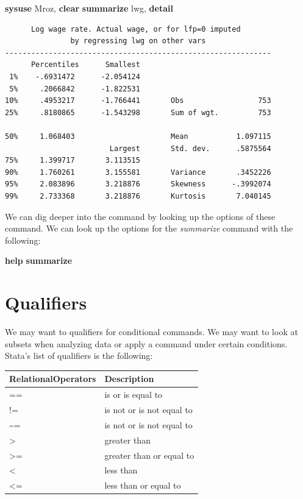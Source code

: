 \documentclass[
]{book}
\newenvironment{Shaded}{\begin{snugshade}}{\end{snugshade}}
\newcommand{\KeywordTok}[1]{\textcolor[rgb]{0.13,0.29,0.53}{\textbf{#1}}}
\newcommand{\NormalTok}[1]{#1}
\begin{document}
\begin{Shaded}
\begin{Highlighting}[]
\KeywordTok{sysuse}\NormalTok{ Mroz, }\KeywordTok{clear}
\KeywordTok{summarize}\NormalTok{ lwg, }\KeywordTok{detail} 
\end{Highlighting}
\end{Shaded}

\begin{verbatim}
      Log wage rate. Actual wage, or for lfp=0 imputed
               by regressing lwg on other vars
-------------------------------------------------------------
      Percentiles      Smallest
 1%    -.6931472      -2.054124
 5%     .2066842      -1.822531
10%     .4953217      -1.766441       Obs                 753
25%     .8180865      -1.543298       Sum of wgt.         753

50%     1.068403                      Mean           1.097115
                        Largest       Std. dev.      .5875564
75%     1.399717       3.113515
90%     1.760261       3.155581       Variance       .3452226
95%     2.083896       3.218876       Skewness      -.3992074
99%     2.733368       3.218876       Kurtosis       7.040145
\end{verbatim}

We can dig deeper into the command by looking up the options of these command. We can look up the options for the \emph{summarize} command with the following:

\begin{Shaded}
\begin{Highlighting}[]
\KeywordTok{help} \KeywordTok{summarize}
\end{Highlighting}
\end{Shaded}

\section{Qualifiers}\label{qualifiers}

We may want to qualifiers for conditional commands. We may want to look at subsets when analyzing data or apply a command under certain conditions. Stata's list of qualifiers is the following:

\begin{tabular}{l|l}
\hline
RelationalOperators & Description\\
\hline
== & is or is equal to\\
\hline
!= & is not or is not equal to\\
\hline
\textasciitilde{}= & is not or is not equal to\\
\hline
> & greater than\\
\hline
>= & greater than or equal to\\
\hline
< & less than\\
\hline
<= & less than or equal to\\
\hline
\end{tabular}
\end{document}

